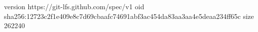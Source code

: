 version https://git-lfs.github.com/spec/v1
oid sha256:12723c2f1e409e8c7d69cbaafc74691abf3ac454da83aa3aa4e5deaa234ff65c
size 262240
